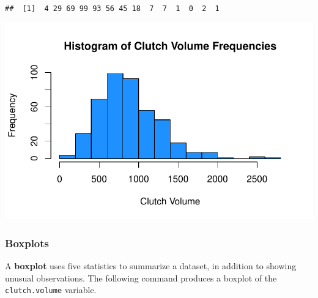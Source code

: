\begin{knitrout}
\color{fgcolor}\begin{kframe}
\begin{alltt}
\hlopt{$}  \hlstd{=} \hlstd{,}  \hlstd{=} \hlstd{)}\hlopt{$}
\end{alltt}
\begin{verbatim}
##  [1]  4 29 69 99 93 56 45 18  7  7  1  0  2  1
\end{verbatim}
\begin{alltt}
\hlstd{(} \hlopt{$}  \hlstd{=} \hlstd{,}  \hlstd{=} \hlstd{,}
      \hlstd{=} \hlstd{,}  \hlstd{=} \hlstd{,}  \hlstd{=} \hlstd{(}\hlstd{,} \hlstd{),}
      \hlstd{=} \hlstd{)}
\end{alltt}
\end{kframe}
\includegraphics[width=\maxwidth]{figure/unnamed-chunk-20-1} 

\end{knitrout}


\subsubsection{Boxplots}

A \textbf{boxplot} uses five statistics to summarize a dataset, in addition to showing unusual observations. The following command produces a boxplot of the \texttt{clutch.volume} variable.

